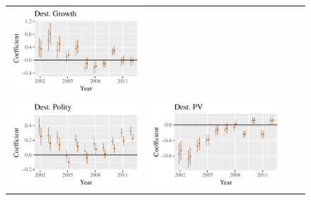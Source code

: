 \documentclass{article}
\begin{document}
\begin{figure}
\begin{tabular}{*{4}{@{}c}@{}}
\includegraphics[scale=.6]{draft_figures/rl_plots/DestGrowth.pdf} \\
\includegraphics[scale=.6]{draft_figures/rl_plots/DestPolity.pdf}   &
\includegraphics[scale=.6]{draft_figures/rl_plots/DestPV.pdf}    & 

\end{tabular}
\end{figure}
\end{document}
